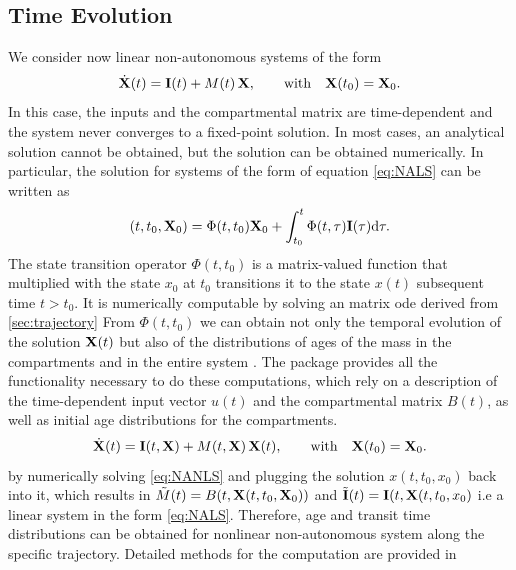 \subsection{Time Evolution} \label{sec:trajectory}
We consider now linear non-autonomous systems of the form
\begin{equation} \label{eq:NALS}
\dot{\mathbf{X}}(t) = \mathbf{I}(t) + M(t) \, \mathbf{X}, \qquad  \mathrm{with} \quad \mathbf{X}(t_0) = \mathbf{X}_0.
\end{equation}
In this case, the inputs and the compartmental matrix are time-dependent and
the system never converges to a fixed-point solution. In most cases, an
analytical solution cannot be obtained, but the solution can be 
obtained numerically. In particular, the solution for systems of the form of equation \eqref{eq:NALS} can be written as
\begin{equation}
(t, t_0, \mathbf{X}_0) = \Phi(t, t_0) \mathbf{X}_0 + \int_{t_0}^{t} \Phi(t, \tau) \mathbf{I}(\tau) \mathrm{d}\tau.
  \label{eqn:Phi}
\end{equation}
The state transition operator $\Phi(t,t_0)$ is a matrix-valued function that
multiplied with the state $x_0$ at $t_0$ transitions it to the state $x(t)$
subsequent time $t > t_0$. It is numerically computable by solving an matrix
ode derived from \eqref{sec:trajectory} 
From $\Phi(t,t_0)$ we can obtain not only the temporal evolution of the
solution $\mathbf{X}(t)$ but also of the distributions of ages of the mass in the compartments and in the entire system \cite{Metzler2018PNAS}.
The \CompartmentalSystems{} package provides all the functionality necessary to do these computations, which rely on a description of the time-dependent input vector $u(t)$ and the compartmental matrix $B(t)$, as well as initial age distributions for the compartments.
\begin{equation} \label{eq:NANLS}
\dot{\mathbf{X}}(t) = \mathbf{I}(t, \mathbf{X}) + M(t, \mathbf{X}) \, \mathbf{X}(t), \qquad  \mathrm{with} \quad \mathbf{X}(t_0) = \mathbf{X}_0.
\end{equation}
by numerically solving \eqref{eq:NANLS} and plugging the solution $x(t, t_0,
x_0)$ back into it, which results in $\tilde{M}(t)=B(t, \mathbf{X}(t, t_0,\mathbf{X}_0))$ and
$\tilde{\mathbf{I}}(t)=\mathbf{I}(t,\mathbf{X}(t, t_0,x_0)$  i.e a linear system in the form
\eqref{eq:NALS}. 
Therefore,  age and transit time
distributions can be obtained for nonlinear non-autonomous system along the
specific trajectory. Detailed methods for the computation are provided in
\cite{Metzler2018PNAS}

